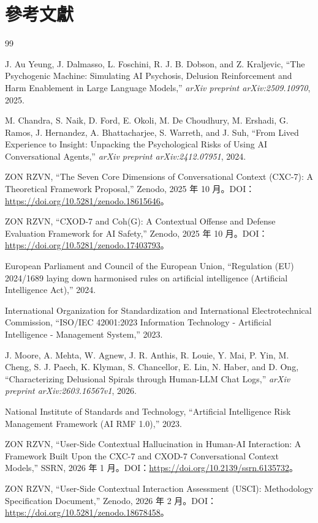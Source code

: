 \documentclass[11pt,a4paper]{article}
\begin{document}
\section{參考文獻}

\begin{thebibliography}{99}

J. Au Yeung, J. Dalmasso, L. Foschini, R. J. B. Dobson, and Z. Kraljevic,
``The Psychogenic Machine: Simulating AI Psychosis, Delusion Reinforcement and Harm Enablement in Large Language Models,''
\textit{arXiv preprint arXiv:2509.10970}, 2025.

M. Chandra, S. Naik, D. Ford, E. Okoli, M. De Choudhury, M. Ershadi, G. Ramos, J. Hernandez, A. Bhattacharjee, S. Warreth, and J. Suh,
``From Lived Experience to Insight: Unpacking the Psychological Risks of Using AI Conversational Agents,''
\textit{arXiv preprint arXiv:2412.07951}, 2024.

ZON RZVN,
``The Seven Core Dimensions of Conversational Context (CXC-7): A Theoretical Framework Proposal,''
Zenodo, 2025 年 10 月。DOI：\url{https://doi.org/10.5281/zenodo.18615646}。

ZON RZVN,
``CXOD-7 and Coh(G): A Contextual Offense and Defense Evaluation Framework for AI Safety,''
Zenodo, 2025 年 10 月。DOI：\url{https://doi.org/10.5281/zenodo.17403793}。

European Parliament and Council of the European Union,
``Regulation (EU) 2024/1689 laying down harmonised rules on artificial intelligence (Artificial Intelligence Act),''
2024.

International Organization for Standardization and International Electrotechnical Commission,
``ISO/IEC 42001:2023 Information Technology - Artificial Intelligence - Management System,''
2023.

J. Moore, A. Mehta, W. Agnew, J. R. Anthis, R. Louie, Y. Mai, P. Yin, M. Cheng, S. J. Paech, K. Klyman, S. Chancellor, E. Lin, N. Haber, and D. Ong,
``Characterizing Delusional Spirals through Human-LLM Chat Logs,''
\textit{arXiv preprint arXiv:2603.16567v1}, 2026.

National Institute of Standards and Technology,
``Artificial Intelligence Risk Management Framework (AI RMF 1.0),''
2023.

ZON RZVN,
``User-Side Contextual Hallucination in Human-AI Interaction: A Framework Built Upon the CXC-7 and CXOD-7 Conversational Context Models,''
SSRN, 2026 年 1 月。DOI：\url{https://doi.org/10.2139/ssrn.6135732}。

ZON RZVN,
``User-Side Contextual Interaction Assessment (USCI): Methodology Specification Document,''
Zenodo, 2026 年 2 月。DOI：\url{https://doi.org/10.5281/zenodo.18678458}。

\end{thebibliography}
\end{document}

